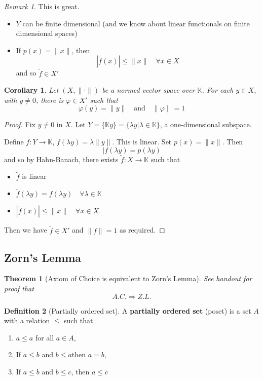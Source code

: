 \documentclass[10pt, oneside, reqno]{amsart}
\theoremstyle{plain}%
\newtheorem{thm}{Theorem}[section]
\newtheorem*{cor}{Corollary}
\theoremstyle{definition}
\newtheorem{defn}[thm]{Definition}
\theoremstyle{remark}
\newtheorem*{rem}{Remark}
\newcommand{\K}{\mathbb{K}}
\renewcommand{\phi}{\varphi}
\begin{document}
\begin{rem}
	This is great.
	\begin{itemize}
		\item $Y$ can be finite dimensional (and we know about linear functionals on finite dimensional spaces)
		\item If $p(x) = \| x \|$, then \[
			|\tilde f (x) | \leq \|x \| \quad \forall x \in X
		\] and so $\tilde f \in X'$
	\end{itemize}
\end{rem}

\begin{cor}
	Let $(X, \| \cdot \|)$ be a normed vector space over $\K$.  For each $y \in X$, with $y \neq 0$, there is $\phi \in X'$ such that \[
		\phi(y) = \| y \| \quad \text{and} \quad \| \phi \| = 1
	\]
\end{cor}
\begin{proof}
	Fix $y \neq 0$ in $X$.  Let $Y = \{ \K y \} = \{ \lambda y | \lambda \in \K \}$, a one-dimensional subspace.  
	
	Define $f : Y \rightarrow \K$, $f( \lambda y) = \lambda \| y \|$.  This is linear.  Set $p(x) = \| x \|$.  Then \[
		| f(\lambda y ) = p(\lambda y)
	\] and so by Hahn-Banach, there exists $\tilde f : X \rightarrow \K$ such that
	\begin{itemize}
		\item $\tilde f$ is linear
		\item $\tilde f(\lambda y) = f( \lambda y) \quad \forall \lambda \in \K$
		\item $| \tilde f (x) | \leq \| x \| \quad \forall x \in X$
	\end{itemize}
	Then we  have $\tilde f \in X'$ and $\| f \| = 1$ as required.
\end{proof}


\subsection{Zorn's Lemma} %
\label{sub:zorn_s_lemma}

\begin{thm}[Axiom of Choice is equivalent to Zorn's Lemma]
	See handout for proof that \[
		A.C. \Rightarrow Z.L.
	\]
\end{thm}

\begin{defn}[Partially ordered set]
	A \textbf{partially ordered set} (poset) is a set $A$ with a relation $\leq$ such that 
	\begin{enumerate}[(1)]
		\item $ a \leq a$ for all $a \in A$,
		\item If $a \leq b$ and $b \leq a$then $a = b$,
		\item If $a \leq b$ and $b \leq c$, then $a \leq c$
	\end{enumerate}
\end{defn}
\end{document}
